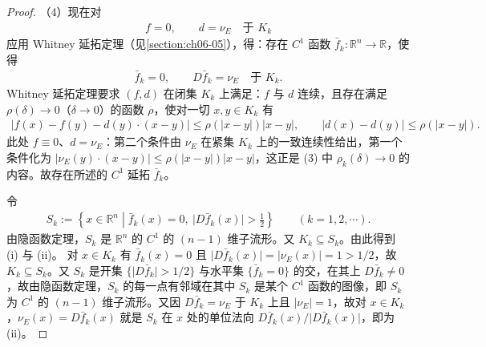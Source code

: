 \documentclass[../../main.tex]{subfiles}%
\begin{document}
\begin{proof}
（4）现在对
\begin{align*}
f=0,\qquad d=\nu_E\quad\text{于 }K_k
\end{align*}
应用 Whitney 延拓定理（见\cref{section:ch06-05}），得：存在 $C^1$ 函数 $\bar f_k:\mathbb{R}^n\to\mathbb{R}$，使得%
\begin{align*}
\bar f_k=0,\qquad D\bar f_k=\nu_E\quad\text{于 }K_k .
\end{align*}
Whitney 延拓定理要求 $(f,d)$ 在闭集 $K_k$ 上满足：$f$ 与 $d$ 连续，且存在满足 $\rho(\delta)\to0$（$\delta\to0$）的函数 $\rho$，使对一切 $x,y\in K_k$ 有
\begin{align*}
\lvert f(x)-f(y)-d(y)\cdot(x-y)\rvert\leqslant\rho(\lvert x-y\rvert)\lvert x-y\rvert,\qquad \lvert d(x)-d(y)\rvert\leqslant\rho(\lvert x-y\rvert).
\end{align*}
此处 $f\equiv0$、$d=\nu_E$：第二个条件由 $\nu_E$ 在紧集 $K_k$ 上的一致连续性给出，第一个条件化为 $\lvert\nu_E(y)\cdot(x-y)\rvert\leqslant\rho(\lvert x-y\rvert)\lvert x-y\rvert$，这正是 (3) 中 $\rho_k(\delta)\to0$ 的内容。故存在所述的 $C^1$ 延拓 $\bar f_k$。

令
\begin{align*}
S_k:=\left\{x\in\mathbb{R}^n\middle|\bar f_k(x)=0,\ \lvert D\bar f_k(x)\rvert>\frac{1}{2}\right\}\qquad(k=1,2,\cdots).
\end{align*}
由隐函数定理，$S_k$ 是 $\mathbb{R}^n$ 的 $C^1$ 的 $(n-1)$ 维子流形。又 $K_k\subseteq S_k$。由此得到 (i) 与 (ii)。
对 $x\in K_k$ 有 $\bar f_k(x)=0$ 且 $\lvert D\bar f_k(x)\rvert=\lvert\nu_E(x)\rvert=1>1/2$，故 $K_k\subseteq S_k$。又 $S_k$ 是开集 $\{\lvert D\bar f_k\rvert>1/2\}$ 与水平集 $\{\bar f_k=0\}$ 的交，在其上 $D\bar f_k\neq0$，故由隐函数定理，$S_k$ 的每一点有邻域在其中 $S_k$ 是某个 $C^1$ 函数的图像，即 $S_k$ 为 $C^1$ 的 $(n-1)$ 维子流形。又因 $D\bar f_k=\nu_E$ 于 $K_k$ 上且 $\lvert\nu_E\rvert=1$，故对 $x\in K_k$，$\nu_E(x)=D\bar f_k(x)$ 就是 $S_k$ 在 $x$ 处的单位法向 $D\bar f_k(x)/\lvert D\bar f_k(x)\rvert$，即为 (ii)。


\end{proof}
\end{document}
